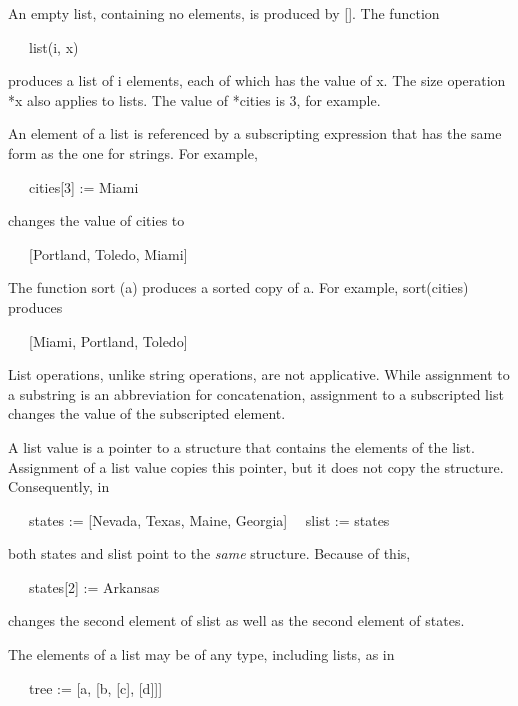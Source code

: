 An empty list, containing no elements, is produced by []. The function

{\ttfamily\mdseries
\ \ \ list(i, x)}

\noindent produces a list of i elements, each of which has the value
of x. The size operation *x also applies to lists. The value of
*cities is 3, for example.

An element of a list is referenced by a subscripting expression that
has the same form as the one for strings. For example,

{\ttfamily\mdseries
\ \ \ cities[3] := {\textquotedbl}Miami{\textquotedbl}}

\noindent changes the value of cities to

{\ttfamily\mdseries
\ \ \ [{\textquotedbl}Portland{\textquotedbl}, {\textquotedbl}Toledo{\textquotedbl},
{\textquotedbl}Miami{\textquotedbl}]}

The function sort (a) produces a sorted copy of a. For example,
sort(cities) produces

{\ttfamily\mdseries
\ \ \ [{\textquotedbl}Miami{\textquotedbl}, {\textquotedbl}Portland{\textquotedbl},
{\textquotedbl}Toledo{\textquotedbl}]}

List operations, unlike string operations, are not applicative. While
assignment to a substring is an abbreviation for concatenation,
assignment to a subscripted list changes the value of the subscripted
element.

A list value is a pointer to a structure that contains the elements of
the list. Assignment of a list value copies this pointer, but it does
not copy the structure. Consequently, in

{\ttfamily\mdseries
\ \ \ states := [{\textquotedbl}Nevada{\textquotedbl}, {\textquotedbl}Texas{\textquotedbl},
{\textquotedbl}Maine{\textquotedbl}, {\textquotedbl}Georgia{\textquotedbl}]\newline
 \ \ slist := states}

\noindent
both states and slist point to the \textit{same} structure. Because of this,

{\ttfamily\mdseries
\ \ \ states[2] := {\textquotedbl}Arkansas{\textquotedbl}}

\noindent
changes the second element of slist as well as the second element of states.

The elements of a list may be of any type, including lists, as in

{\ttfamily\mdseries
\ \ \ tree := [{\textquotedbl}a{\textquotedbl}, [{\textquotedbl}b{\textquotedbl}, [{\textquotedbl}c{\textquotedbl}],
[{\textquotedbl}d{\textquotedbl}]]]}

